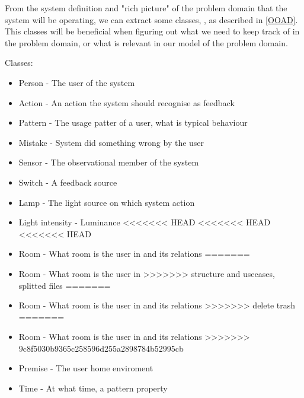 From the system definition and "rich picture" of the problem domain that the system will be operating, we can extract some classes, , as described in \cref{OOAD}. This classes will be beneficial when figuring out what we need to keep track of in the problem domain, or what is relevant in our model of the problem domain.

Classes:
\begin{itemize}
\item Person - The user of the system
\item Action - An action the system should recognise as feedback
\item Pattern - The usage patter of a user, what is typical behaviour
\item Mistake - System did something wrong by the user
\item Sensor - The observational member of the system
\item Switch - A feedback source
\item Lamp - The light source on which system action
\item Light intensity - Luminance
<<<<<<< HEAD
<<<<<<< HEAD
<<<<<<< HEAD
\item Room - What room is the user in and its relations
=======
\item Room - What room is the user in
>>>>>>> structure and usecases, splitted files
=======
\item Room - What room is the user in and its relations
>>>>>>> delete trash
=======
\item Room - What room is the user in and its relations
>>>>>>> 9c8f5030b9365c258596d255a2898784b52995cb
\item Premise - The user home enviroment
\item Time - At what time, a pattern property
\end{itemize}
